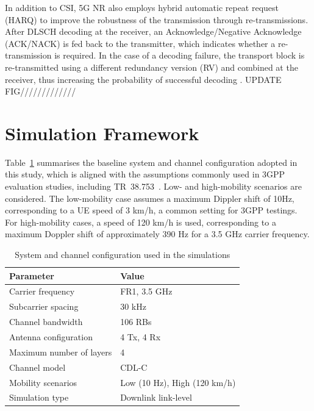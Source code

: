 \documentclass[a4paper,12pt,onecolumn]{article}
\begin{document}
	In addition to CSI, 5G NR also employs hybrid automatic repeat request (HARQ) to improve the robustness of the transmission through re-transmissions. After DLSCH decoding at the receiver, an Acknowledge/Negative Acknowledge (ACK/NACK) is fed back to the transmitter, which indicates whether a re-transmission is required. In the case of a decoding failure, the transport block is re-transmitted using a different redundancy version (RV) and combined at the receiver, thus increasing the probability of successful decoding \cite{EricssonBook} \cite{MathWorks2026}. UPDATE FIG/////////////
	
	\section{Simulation Framework}

	Table~\ref{tab:system_config} summarises the baseline system and channel configuration adopted in this study, which is aligned with the assumptions commonly used in 3GPP evaluation studies, including TR~38.753~\cite{3GPPSimulationSpec}. Low- and high-mobility scenarios are considered. The low-mobility case assumes a maximum Dippler shift of 10Hz, corresponding to a UE speed of 3 km/h, a common setting for 3GPP testings. For high-mobility cases, a speed of 120 km/h is used, corresponding to a maximum Doppler shift of approximately 390 Hz for a 3.5 GHz carrier frequency.
 
	
	\begin{table}[h]
		\centering
		\caption{System and channel configuration used in the simulations }
		\label{tab:system_config}
		\begin{tabular}{ll}
			\hline
			\textbf{Parameter} & \textbf{Value} \\
			\hline
			Carrier frequency      & FR1, 3.5 GHz \\
			Subcarrier spacing          & 30 kHz \\
			Channel bandwidth           & 106 RBs \\
			Antenna configuration       & 4 Tx, 4 Rx \\
			Maximum number of layers    & 4 \\
			Channel model               & CDL-C \\
			Mobility scenarios          & Low (10 Hz), High (120 km/h)\\
			Simulation type             & Downlink link-level \\
			\hline
		\end{tabular}
	\end{table}
	
\end{document}
